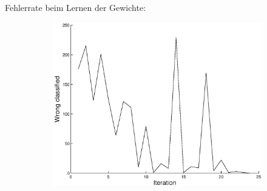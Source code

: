 \documentclass{article}
\begin{document}
	Fehlerrate beim Lernen der Gewichte:
	\begin{figure}[H]
	  \begin{subfigure}
	    \centering
	    \includegraphics[scale=0.75]{task3-perceptron.eps}
	  \end{subfigure}
	\end{figure}
	
	
\end{document}
